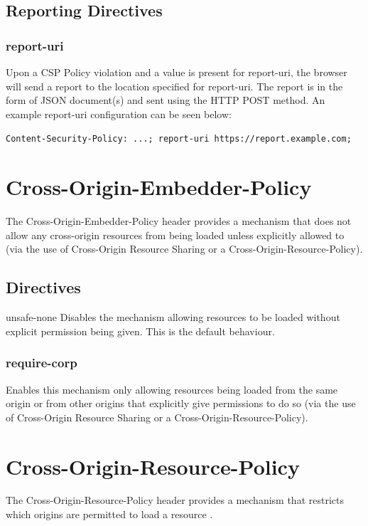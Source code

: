 \documentclass{mscreport}
\begin{document}
\subsection{Reporting Directives}

\subsubsection{report-uri}
Upon a CSP Policy violation and a value is present for report-uri, the browser will send a report to the location specified for report-uri. The report is in the form of JSON document(s) and sent using the HTTP POST method. An example report-uri configuration can be seen below:

\vspace{0.3cm} \noindent
\texttt{Content-Security-Policy: ...; report-uri https://report.example.com;}

\newpage

\section{Cross-Origin-Embedder-Policy}
\label{section:coep}

The Cross-Origin-Embedder-Policy header provides a mechanism that does not allow any cross-origin resources from being loaded unless explicitly allowed to (via the use of Cross-Origin Resource Sharing or a Cross-Origin-Resource-Policy).

\subsection{Directives}
unsafe-none
Disables the mechanism allowing resources to be loaded without explicit permission being given. This is the default behaviour.

\subsubsection{require-corp}
Enables this mechanism only allowing resources being loaded from the same origin or from other origins that explicitly give permissions to do so (via the use of Cross-Origin Resource Sharing or a Cross-Origin-Resource-Policy).

\section{Cross-Origin-Resource-Policy}
\label{section:corp}

The Cross-Origin-Resource-Policy header provides a mechanism that restricts which origins are permitted to load a resource \cite{Apple_undated-au}.
\end{document}
